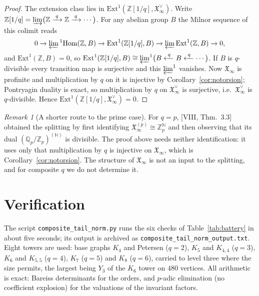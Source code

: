 \documentclass[11pt]{amsart}
\numberwithin{equation}{section}
\theoremstyle{definition}
\theoremstyle{remark}
\newtheorem{remark}[theorem]{Remark}
\newcommand{\Z}{\mathbb{Z}}
\newcommand{\Q}{\mathbb{Q}}
\newcommand{\XX}{\mathfrak{X}_\infty}
\begin{document}
\begin{proof}
The extension class lies in $\mathrm{Ext}^1(\Z[1/q],\XX^\vee)$. Write
$\Z[1/q]=\varinjlim\bigl(\Z\xrightarrow{\;q\;}\Z\xrightarrow{\;q\;}\cdots\bigr)$. For any
abelian group $B$ the Milnor sequence of this colimit reads
\[
0\to\varprojlim{}^1\mathrm{Hom}(\Z,B)\to\mathrm{Ext}^1(\Z[1/q],B)
\to\varprojlim\mathrm{Ext}^1(\Z,B)\to0 ,
\]
and $\mathrm{Ext}^1(\Z,B)=0$, so
$\mathrm{Ext}^1(\Z[1/q],B)\cong\varprojlim^1\bigl(B\xleftarrow{\;q\;}B\xleftarrow{\;q\;}\cdots\bigr)$.
If $B$ is $q$-divisible every transition map is surjective and this $\varprojlim^1$
vanishes. Now $\XX$ is profinite and multiplication by $q$ on it is injective by
Corollary~\ref{cor:notorsion}; Pontryagin duality is exact, so multiplication by $q$ on
$\XX^\vee$ is surjective, i.e.\ $\XX^\vee$ is $q$-divisible. Hence
$\mathrm{Ext}^1(\Z[1/q],\XX^\vee)=0$.
\end{proof}

\begin{remark}[A shorter route to the prime case]\label{rem:shorter}
For $q=p$, [VIII, Thm.~3.3] obtained the splitting by first identifying
$\XX^{(p)}\cong\Z_p^{\mathbb N}$ and then observing that its dual
$(\Q_p/\Z_p)^{(\mathbb N)}$ is divisible. The proof above needs neither identification: it
uses only that multiplication by $q$ is injective on $\XX$, which is
Corollary~\ref{cor:notorsion}. The structure of $\XX$ is not an input to the splitting,
and for composite $q$ we do not determine it.
\end{remark}

\section{Verification}\label{sec:battery}

The script \texttt{composite\_tail\_norm.py} runs the six checks of
Table~\ref{tab:battery} in about five seconds; its output is archived as
\texttt{composite\_tail\_norm\_output.txt}. Eight towers are used: base graphs $K_4$ and
Petersen ($q=2$), $K_5$ and $K_{4,4}$ ($q=3$), $K_6$ and $K_{5,5}$ ($q=4$), $K_7$ ($q=5$)
and $K_8$ ($q=6$), carried to level three where the size permits, the largest being
$Y_3$ of the $K_6$ tower on $480$ vertices. All arithmetic is exact: Bareiss determinants
for the orders, and $p$-adic elimination (no coefficient explosion) for the valuations of
the invariant factors.
\end{document}
